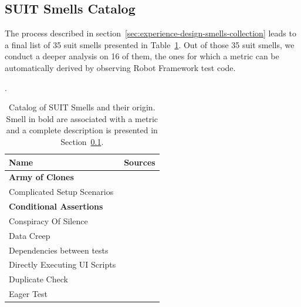 \subsection{SUIT Smells Catalog}
\label{sec:results-smells-catalog}

The process described in section~\ref{sec:experience-design-smells-collection} leads to a final list of 35 \gls{suit} smells presented in Table~\ref{tab:smell-catalog}. Out of those 35 \gls{suit} smells, we conduct a deeper analysis on 16 of them, the ones for which a metric can be automatically derived by observing Robot Framework test code.

\begin{table}
\centering

\caption{Catalog of SUIT Smells and their origin. Smell in bold are associated with a metric and a complete description is presented in Section~\ref{sec:results-smells-catalog}.}
\label{tab:smell-catalog}.

\begin{tabular}{>{\raggedright}p{1.5in}>{\raggedright}p{4in}}

\toprule
\scriptsize{\textbf{Name}} & \scriptsize{\textbf{Sources}}\tabularnewline
\toprule

\scriptsize{\textbf{Army of Clones}} & \scriptsize{\cite{Chen2012, Hauptmann2013, Hauptmann2015, Jones2019}} \tabularnewline 


\scriptsize{Complicated Setup Scenarios} & \scriptsize{\cite{Scott2015}} \tabularnewline 

\scriptsize{\textbf{Conditional Assertions}} & \scriptsize{\cite{Gawinecki2016}} \tabularnewline 

\scriptsize{Conspiracy Of Silence} & \scriptsize{\cite{Gawinecki2016, Sheth2020}} \tabularnewline 

\scriptsize{Data Creep} & \scriptsize{\cite{Alegroth2016b, Siminiuc2019, Shay2019}} \tabularnewline 

\scriptsize{Dependencies between tests} & \scriptsize{\cite{Klarck2014, Advolodkin2018, Cripsin2018, Bushnev2019, Goldberg2019}} \tabularnewline 

\scriptsize{Directly Executing UI Scripts} & \scriptsize{\cite{Scott2015}} \tabularnewline 

\scriptsize{Duplicate Check} & \scriptsize{\cite{Buwalda2019}} \tabularnewline 

\scriptsize{Eager Test} &  \scriptsize{\cite{England2016, Renaudin2016, Cripsin2018, Sciamanna2019, Temov2020}} \tabularnewline 


\end{tabular}
\end{table}
